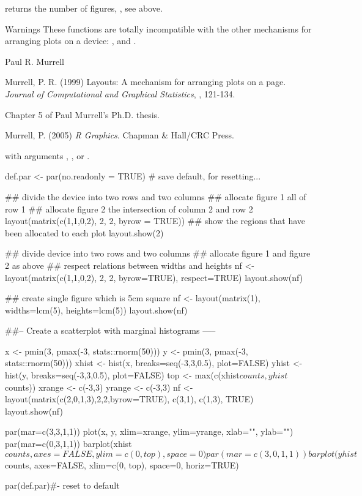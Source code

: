 %
\begin{Value}
 returns the number of figures, , see above.
\end{Value}
%
\begin{Section}{Warnings}
These functions are totally incompatible with the other mechanisms for
arranging plots on a device: ,
 and .
\end{Section}
%
\begin{Author}\relax
Paul R. Murrell
\end{Author}
%
\begin{References}\relax
Murrell, P. R. (1999) Layouts: A mechanism for arranging plots on a page. 
\emph{Journal of Computational and Graphical Statistics},
, 121-134. 

Chapter 5 of Paul Murrell's Ph.D. thesis.

Murrell, P. (2005) \emph{R Graphics}. Chapman \& Hall/CRC Press.
\end{References}
%
\begin{SeeAlso}\relax
{} with arguments , , or
.
\end{SeeAlso}
%
\begin{Examples}
\begin{ExampleCode}
def.par <- par(no.readonly = TRUE) # save default, for resetting...

## divide the device into two rows and two columns
## allocate figure 1 all of row 1
## allocate figure 2 the intersection of column 2 and row 2
layout(matrix(c(1,1,0,2), 2, 2, byrow = TRUE))
## show the regions that have been allocated to each plot
layout.show(2)

## divide device into two rows and two columns
## allocate figure 1 and figure 2 as above
## respect relations between widths and heights
nf <- layout(matrix(c(1,1,0,2), 2, 2, byrow=TRUE), respect=TRUE)
layout.show(nf)

## create single figure which is 5cm square
nf <- layout(matrix(1), widths=lcm(5), heights=lcm(5))
layout.show(nf)


##-- Create a scatterplot with marginal histograms -----

x <- pmin(3, pmax(-3, stats::rnorm(50)))
y <- pmin(3, pmax(-3, stats::rnorm(50)))
xhist <- hist(x, breaks=seq(-3,3,0.5), plot=FALSE)
yhist <- hist(y, breaks=seq(-3,3,0.5), plot=FALSE)
top <- max(c(xhist$counts, yhist$counts))
xrange <- c(-3,3)
yrange <- c(-3,3)
nf <- layout(matrix(c(2,0,1,3),2,2,byrow=TRUE), c(3,1), c(1,3), TRUE)
layout.show(nf)

par(mar=c(3,3,1,1))
plot(x, y, xlim=xrange, ylim=yrange, xlab="", ylab="")
par(mar=c(0,3,1,1))
barplot(xhist$counts, axes=FALSE, ylim=c(0, top), space=0)
par(mar=c(3,0,1,1))
barplot(yhist$counts, axes=FALSE, xlim=c(0, top), space=0, horiz=TRUE)

par(def.par)#- reset to default
\end{ExampleCode}
\end{Examples}
